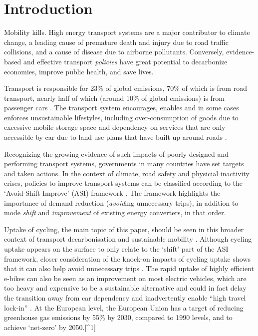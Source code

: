 \documentclass[
  super,
  preprint,
  3p]{elsarticle}
\begin{document}
    \ifdefined\Shaded\renewenvironment{Shaded}{\begin{tcolorbox}[frame hidden, boxrule=0pt, interior hidden, sharp corners, borderline west={3pt}{0pt}{shadecolor}, enhanced, breakable]}{\end{tcolorbox}}\fi

\newpage{}

\hypertarget{introduction}{%
\section{Introduction}\label{introduction}}

Mobility kills. High energy transport systems are a major contributor to
climate change, a leading cause of premature death and injury due to
road traffic collisions, and a cause of disease due to airborne
pollutants. Conversely, evidence-based and effective transport
\emph{policies} have great potential to decarbonize economies, improve
public health, and save lives.

Transport is responsible for 23\% of global emissions, 70\% of which is
from road transport, nearly half of which (around 10\% of global
emissions) is from passenger cars \citep{jaramillo2022}. The transport
system encourages, enables and in some cases enforces unsustainable
lifestyles, including over-consumption of goods due to excessive mobile
storage space and dependency on services that are only accessible by car
due to land use plans that have built up around roads
\citep{gray2001, shergold2012, motte-baumvol2010}.

Recognizing the growing evidence of such impacts of poorly designed and
performing transport systems, governments in many countries have set
targets and taken actions. In the context of climate, road safety and
physicial inactivity crises, policies to improve transport systems can
be classified according to the `Avoid-Shift-Improve' (ASI) framework
\citep{jaramillo2022}. The framework highlights the importance of demand
reduction (\emph{avoid}ing unnecessary trips), in addition to mode
\emph{shift} and \emph{improvement} of existing energy converters, in
that order.

Uptake of cycling, the main topic of this paper, should be seen in this
broader context of transport decarbonisation \citep{brand2020} and
sustainable mobility \citep{burns2013}. Although cycling uptake appears
on the surface to only relate to the `shift' part of the ASI framework,
closer consideration of the knock-on impacts of cycling uptake shows
that it can also help avoid unnecessary trips \citep{nello-deakin2020}.
The rapid uptake of highly efficient e-bikes can also be seen as an
improvement on most electric vehicles, which are too heavy and expensive
to be a sustainable alternative and could in fact delay the transition
away from car dependency and inadvertently enable ``high travel
lock-in'' \citep{anable2019}. At the European level, the European Union
has a target of reducing greenhouse gas emissions by 55\% by 2030,
compared to 1990 levels, and to achieve `net-zero' by 2050.{[}\^{}1{]}
\end{document}
